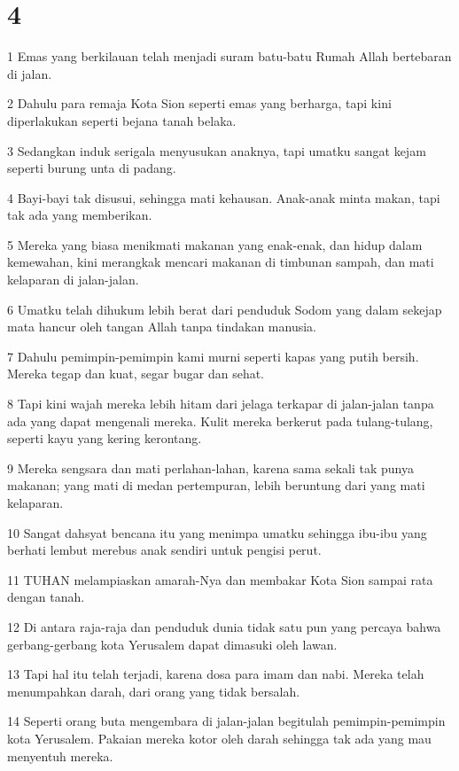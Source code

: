 \chapter{4}

\par 1 Emas yang berkilauan telah menjadi suram batu-batu Rumah Allah bertebaran di jalan.
\par 2 Dahulu para remaja Kota Sion seperti emas yang berharga, tapi kini diperlakukan seperti bejana tanah belaka.
\par 3 Sedangkan induk serigala menyusukan anaknya, tapi umatku sangat kejam seperti burung unta di padang.
\par 4 Bayi-bayi tak disusui, sehingga mati kehausan. Anak-anak minta makan, tapi tak ada yang memberikan.
\par 5 Mereka yang biasa menikmati makanan yang enak-enak, dan hidup dalam kemewahan, kini merangkak mencari makanan di timbunan sampah, dan mati kelaparan di jalan-jalan.
\par 6 Umatku telah dihukum lebih berat dari penduduk Sodom yang dalam sekejap mata hancur oleh tangan Allah tanpa tindakan manusia.
\par 7 Dahulu pemimpin-pemimpin kami murni seperti kapas yang putih bersih. Mereka tegap dan kuat, segar bugar dan sehat.
\par 8 Tapi kini wajah mereka lebih hitam dari jelaga terkapar di jalan-jalan tanpa ada yang dapat mengenali mereka. Kulit mereka berkerut pada tulang-tulang, seperti kayu yang kering kerontang.
\par 9 Mereka sengsara dan mati perlahan-lahan, karena sama sekali tak punya makanan; yang mati di medan pertempuran, lebih beruntung dari yang mati kelaparan.
\par 10 Sangat dahsyat bencana itu yang menimpa umatku sehingga ibu-ibu yang berhati lembut merebus anak sendiri untuk pengisi perut.
\par 11 TUHAN melampiaskan amarah-Nya dan membakar Kota Sion sampai rata dengan tanah.
\par 12 Di antara raja-raja dan penduduk dunia tidak satu pun yang percaya bahwa gerbang-gerbang kota Yerusalem dapat dimasuki oleh lawan.
\par 13 Tapi hal itu telah terjadi, karena dosa para imam dan nabi. Mereka telah menumpahkan darah, dari orang yang tidak bersalah.
\par 14 Seperti orang buta mengembara di jalan-jalan begitulah pemimpin-pemimpin kota Yerusalem. Pakaian mereka kotor oleh darah sehingga tak ada yang mau menyentuh mereka.
